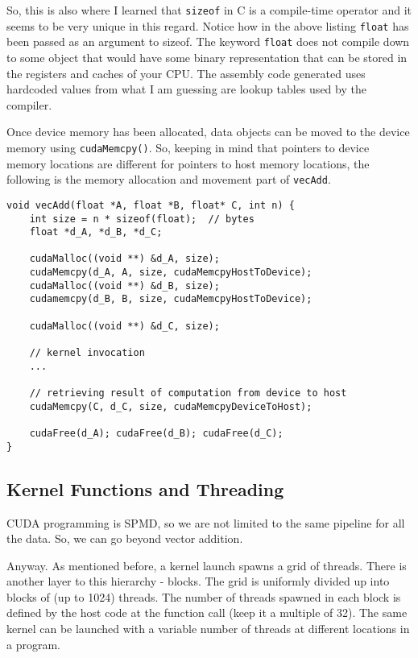 So, this is also where I learned that \texttt{sizeof} in C is a
compile-time operator and it seems to be very unique in this
regard. Notice how in the above listing \texttt{float} has been
passed as an argument to sizeof. The keyword \texttt{float} does
not compile down to some object that would have some binary 
representation that can be stored in the registers and caches
of your CPU. The assembly code generated uses hardcoded values
from what I am guessing are lookup tables used by the compiler.

Once device memory has been allocated, data objects can be moved
to the device memory using \texttt{cudaMemcpy()}. So, keeping in
mind that pointers  to device memory locations are different for
pointers to host memory locations, the following is the memory
allocation and movement part of \texttt{vecAdd}.

\begin{verbatim}
void vecAdd(float *A, float *B, float* C, int n) {
    int size = n * sizeof(float);  // bytes
    float *d_A, *d_B, *d_C;

    cudaMalloc((void **) &d_A, size);
    cudaMemcpy(d_A, A, size, cudaMemcpyHostToDevice);
    cudaMalloc((void **) &d_B, size);
    cudamemcpy(d_B, B, size, cudaMemcpyHostToDevice);

    cudaMalloc((void **) &d_C, size);

    // kernel invocation
    ...

    // retrieving result of computation from device to host
    cudaMemcpy(C, d_C, size, cudaMemcpyDeviceToHost);

    cudaFree(d_A); cudaFree(d_B); cudaFree(d_C);
}
\end{verbatim}

\subsection*{Kernel Functions and Threading}
CUDA programming is SPMD, so we are not limited to the same pipeline
for all the data. So, we can go beyond vector addition.

Anyway. As mentioned before, a kernel launch spawns a grid of threads.
There is another layer to this hierarchy - blocks. The grid is uniformly
divided up into blocks of (up to 1024) threads. The number of
threads spawned in each block is defined by the host code at the
function call (keep it a multiple of 32). The same kernel can be
launched with a variable
number of threads at different locations in a program.


